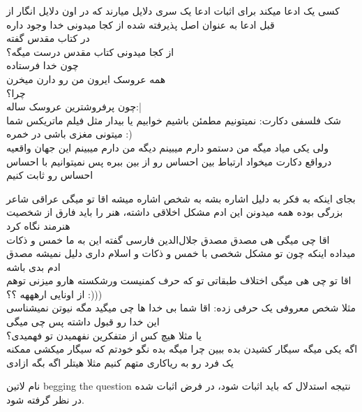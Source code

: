 \documentclass{article}
\begin{document}
	 کسی یک ادعا میکند برای اثبات ادعا یک سری دلایل میارند که در اون دلایل
	انگار از قبل ادعا به عنوان اصل پذیرفته شده 
	از کجا میدونی خدا وجود داره\\
	در کتاب مقدس گفته\\
	از کجا میدونی کتاب مقدس درست میگه؟\\
	چون خدا فرستاده\\
	همه عروسک ایرون من رو دارن میخرن\\
	چرا؟\\
	چون پرفروشترین عروسک ساله:|\\
	شک فلسفی دکارت: نمیتونیم مطمئن باشیم خوابیم یا بیدار مثل فیلم ماتریکس شما میتونی مغزی باشی در خمره :)\ \\
	ولی یکی میاد میگه من دستمو دارم میبینم دیگه من دارم میبینم این جهان واقعیه درواقع دکارت میخواد ارتباط بین احساس رو از بین ببره پس 
	نمیتوانیم با احساس احساس رو ثابت کنیم
	
	 بجای اینکه به فکر به دلیل اشاره بشه به شخص اشاره میشه
	 اقا تو میگی عراقی شاعر بزرگی بوده همه میدونن این ادم مشکل اخلاقی داشته، هنر را باید فارق از شخصیت هنرمند نگاه کرد\\
	اقا چی میگی هی مصدق مصدق جلال‌الدین فارسی گفته این به ما خمس و ذکات میداده اینکه چون تو مشکل شخصی با خمس و ذکات و اسلام داری دلیل 
	نمیشه مصدق ادم بدی باشه \\ اقا تو چی هی میگی اختلاف طبقاتی تو که حرف کمنیست ورشکسته هارو میزنی توهم از اونایی ارهههه ؟؟ :)))\\
	 مثلا شخص معروفی یک حرفی زده:‌ اقا شما بی خدا ها چی میگید مگه نیوتن نمیشناسی این خدا رو قبول داشته پس چی میگی\\
	یا مثلا هیچ کس از متفکرین نفهمیدن تو فهمیدی؟\\
	
	 اگه یکی میگه سیگار کشیدن بده ببین چرا میگه بده نگو خودتم که سیگار میکشی ممکنه یک فرد 
	رو به ریاکاری متهم کنیم مثلا هیتلر اگه بگه ازادی
	
	
	
	
	
	
	
	
	نام لاتین  begging the question
	نتیجه استدلال که باید اثبات شود،‌ در فرض اثبات شده در نظر گرفته شود.\\
	
	
\end{document}
